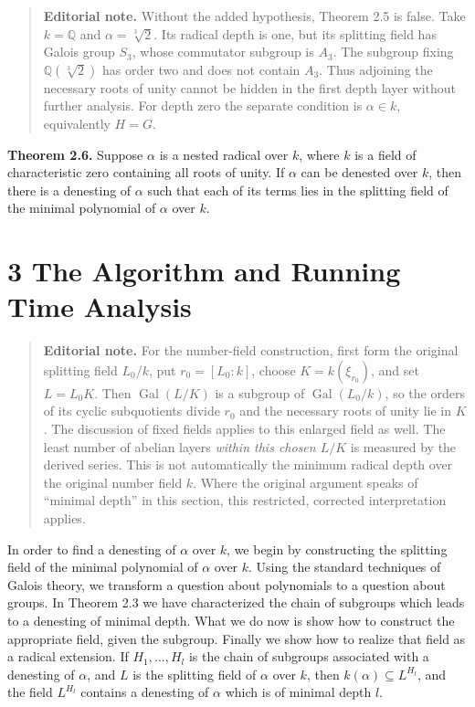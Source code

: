 \documentclass[11pt,letterpaper]{article}
\newcommand{\editorialnote}[1]{\begin{quote}\small\noindent
  \textbf{Editorial note.} #1\end{quote}}
\newcommand{\Q}{\mathbb{Q}}
\DeclareMathOperator{\Gal}{Gal}
\begin{document}
\editorialnote{Without the added hypothesis, Theorem 2.5 is false. Take $k=\Q$ and $\alpha=\sqrt[3]{2}$. Its radical depth is one, but its splitting field has Galois group $S_3$, whose commutator subgroup is $A_3$. The subgroup fixing $\Q(\sqrt[3]{2})$ has order two and does not contain $A_3$. Thus adjoining the necessary roots of unity cannot be hidden in the first depth layer without further analysis. For depth zero the separate condition is $\alpha\in k$, equivalently $H=G$.}


\noindent\textbf{Theorem 2.6.} Suppose $\alpha$ is a nested radical over $k$, where $k$ is a field of characteristic zero containing all roots of unity. If $\alpha$ can be denested over $k$, then there is a denesting of $\alpha$ such that each of its terms lies in the splitting field of the minimal polynomial of $\alpha$ over $k$.

\section*{3 The Algorithm and Running Time Analysis}
\editorialnote{For the number-field construction, first form the original splitting field $L_0/k$, put $r_0=[L_0:k]$, choose $K=k(\xi_{r_0})$, and set $L=L_0K$. Then $\Gal(L/K)$ is a subgroup of $\Gal(L_0/k)$, so the orders of its cyclic subquotients divide $r_0$ and the necessary roots of unity lie in $K$. The discussion of fixed fields applies to this enlarged field as well. The least number of abelian layers \emph{within this chosen $L/K$} is measured by the derived series. This is not automatically the minimum radical depth over the original number field $k$. Where the original argument speaks of ``minimal depth'' in this section, this restricted, corrected interpretation applies.}
In order to find a denesting of $\alpha$ over $k$, we begin by constructing the splitting field of the minimal polynomial of $\alpha$ over $k$. Using the standard techniques of Galois theory, we transform a question about polynomials to a question about groups. In Theorem 2.3 we have characterized the chain of subgroups which leads to a denesting of minimal depth. What we do now is show how to construct the appropriate field, given the subgroup. Finally we show how to realize that field as a radical extension. If $H_{1}, \ldots, H_{l}$ is the chain of subgroups associated with a denesting of $\alpha$, and $L$ is the splitting field of $\alpha$ over $k$, then $k(\alpha) \subseteq L^{H_{l}}$, and the field $L^{H_{l}}$ contains a denesting of $\alpha$ which is of minimal depth $l$.
\end{document}
